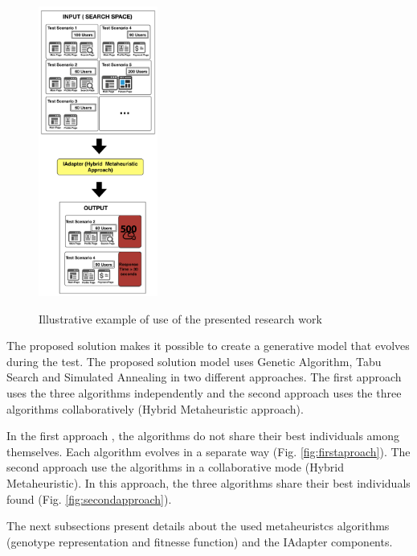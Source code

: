 \begin{figure}[ht]
\centering
\caption{Illustrative example of use of the presented research work}
\includegraphics[width=0.35\textwidth]{./images/solution.png}
\label{fig:solution}
\end{figure}


The proposed solution makes it possible to create a generative model that evolves during the test. The proposed solution model uses Genetic Algorithm, Tabu Search and Simulated Annealing in two different approaches.  The first approach uses the three algorithms independently and the second approach uses the three algorithms collaboratively (Hybrid Metaheuristic approach).

In the first approach , the algorithms do not share their best individuals among themselves. Each algorithm evolves in a separate way (Fig. \ref{fig:firstaproach}). The second approach use the algorithms in a collaborative mode (Hybrid Metaheuristic). In this approach, the three algorithms share their best individuals found (Fig. \ref{fig:secondapproach}).

The next subsections present details about the used metaheuristcs algorithms (genotype representation and fitnesse function) and the IAdapter components.

